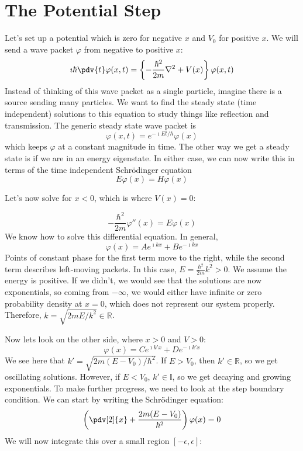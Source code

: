 \documentclass[a4paper,twoside,master.tex]{subfiles}
\begin{document}
\section{The Potential Step}
\label{sec:the_potential_step}
Let's set up a potential which is zero for negative $ x $ and $ V_0 $ for positive $ x $. We will send a wave packet $ \varphi $ from negative to positive $ x $:
\begin{equation}
    \imath\hbar \pdv{t} \varphi(x, t) = \left\{ - \frac{\hbar^2}{2m}\nabla^2 + V(x)  \right\} \varphi(x, t)
\end{equation}
Instead of thinking of this wave packet as a single particle, imagine there is a source sending many particles. We want to find the steady state (time independent) solutions to this equation to study things like reflection and transmission. The generic steady state wave packet is
\begin{equation}
    \varphi(x,t) = e^{-\imath E t/\hbar} \varphi(x)
\end{equation}
which keeps $ \varphi $ at a constant magnitude in time. The other way we get a steady state is if we are in an energy eigenstate. In either case, we can now write this in terms of the time independent Schr\"odinger equation
\begin{equation}
    E \varphi(x) = H \varphi(x)
\end{equation}

Let's now solve for $ x<0 $, which is where $ V(x) = 0 $:

\begin{equation}
    - \frac{\hbar^2}{2m} \varphi''(x) = E \varphi(x)
\end{equation}
We know how to solve this differential equation. In general,
\begin{equation}
    \varphi(x) = A e^{\imath k x} + B e^{-\imath k x}
\end{equation}
Points of constant phase for the first term move to the right, while the second term describes left-moving packets. In this case, $ E = \frac{\hbar^2}{2m} k^2 > 0 $. We assume the energy is positive. If we didn't, we would see that the solutions are now exponentials, so coming from $ - \infty $, we would either have infinite or zero probability density at $ x = 0 $, which does not represent our system properly. Therefore, $ k = \sqrt{2mE/k^2} \in \mathbb{R} $.

Now lets look on the other side, where $ x > 0 $ and $ V > 0 $:
\begin{equation}
    \varphi(x) = C e^{\imath k' x} + D e^{-\imath k' x}
\end{equation}
We see here that $ k' = \sqrt{2m(E-V_0)/\hbar^2} $. If $ E > V_0 $, then $ k' \in \mathbb{R} $, so we get oscillating solutions. However, if $ E < V_0 $, $ k' \in \mathbb{I} $, so we get decaying and growing exponentials. To make further progress, we need to look at the step boundary condition. We can start by writing the Schr\"odinger equation:
\begin{equation}
    \left(\pdv[2]{x} + \frac{2m(E-V_0)}{\hbar^2} \right) \varphi(x) = 0
\end{equation}
We will now integrate this over a small region $ [-\epsilon,\epsilon] $:
\end{document}
